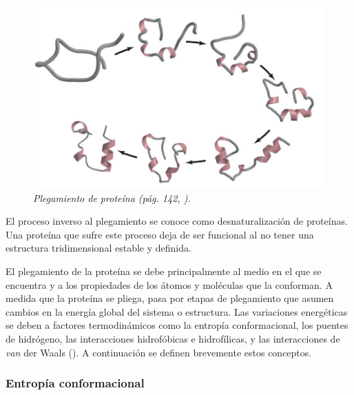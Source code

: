 \begin{figure}[h]
	\centering
	\includegraphics[scale=.5]{images/folding.png}
	\caption{\em Plegamiento de proteína (pág. 142, \citealp{lehninger}).}
	\label{fig:protein-folding}
\end{figure}

El proceso inverso al plegamiento se conoce como desnaturalización de proteínas. Una proteína que sufre este proceso deja de ser funcional al no tener una estructura tridimensional estable y definida. 

El plegamiento de la proteína se debe principalmente al medio en el que se encuentra y a los propiedades de los átomos y moléculas que la conforman. A medida que la proteína se pliega, pasa por etapas de plegamiento que asumen cambios en la energía global del sistema o estructura. Las variaciones energéticas se deben a factores termodinámicos como la entropía conformacional, los puentes de hidrógeno, las interacciones hidrofóbicas e hidrofílicas, y las interacciones de \textit{van} der Waals (\citealp{folding}). A continuación se definen brevemente estos conceptos.

\subsubsection{Entropía conformacional}


